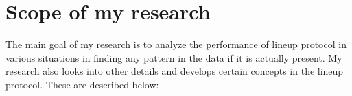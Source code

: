 \documentclass[12]{report}
\begin{document}



%

\section{Scope of my research}

The main goal of my research is to analyze the performance of lineup protocol in various situations in finding any pattern in the data if it is actually present. My research also looks into other details and develops certain concepts in the lineup protocol. These are described below: \\
\end{document}
